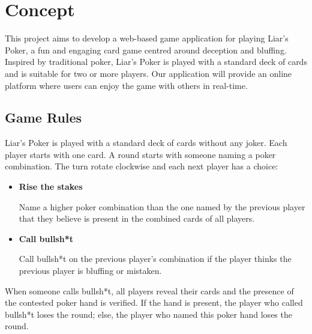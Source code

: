 \documentclass{scrartcl}
\begin{document}
\section{Concept}\label{concept}


This project aims to develop a web-based game application for playing Liar's Poker, a fun and engaging
card game centred around deception and bluffing. Inspired by traditional poker, Liar's Poker is played
with a standard deck of cards and is suitable for two or more players. Our application will provide an
online platform where users can enjoy the game with others in real-time.

\subsection{Game Rules}\label{game-rules}
Liar's Poker is played with a standard deck of cards without any joker. Each player starts with one
card. A round starts with someone naming a poker combination. The turn rotate clockwise and each
next player has a choice:
\begin{itemize}
      \item \textbf{Rise the stakes}\par
            Name a higher poker combination than the one named by the previous player that
            they believe is present in the combined cards of all players.
      \item \textbf{Call bullsh*t} \par
            Call bullsh*t on the previous player's combination if the player thinks the previous
            player is bluffing or mistaken.
\end{itemize}
When someone calls bullsh*t, all players reveal their cards and the presence of the contested poker
hand is verified. If the hand is present, the player who called bullsh*t loses the round; else, the
player who named this poker hand loses the round.
\end{document}
